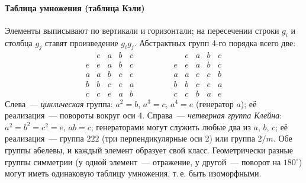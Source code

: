 \paragraph{Таблица умножения (таблица Кэли)}
Элементы выписывают по вертикали и горизонтали; на пересечении строки
$g_i$ и столбца $g_j$ ставят произведение $g_ig_j$. Абстрактных групп
4-го порядка всего две:
\[
\begin{array}{c|cccc}
 & e & a & b & c\\\hline
e & e & a & b & c\\
a & a & b & c & e\\
b & b & c & e & a\\
c & c & e & a & b
\end{array}
\qquad\qquad
\begin{array}{c|cccc}
 & e & a & b & c\\\hline
e & e & a & b & c\\
a & a & e & c & b\\
b & b & c & e & a\\
c & c & b & a & e
\end{array}
\]
Слева~— \emph{циклическая} группа: $a^2=b$, $a^3=c$, $a^4=e$ (генератор $a$);
её реализация~— повороты вокруг оси 4. Справа~— \emph{четверная группа Клейна}:
$a^2=b^2=c^2=e$, $ab=c$; генераторами могут служить любые два из $a$, $b$,
$c$; её реализация~— группа $222$ (три перпендикулярные оси 2) или группа
$2/m$. Обе группы абелевы, и каждый элемент образует свой класс.
Геометрически разные группы симметрии (у одной элемент~— отражение, у
другой~— поворот на $180^\circ$) могут иметь одинаковую таблицу умножения,
т.\,е. быть изоморфными.

